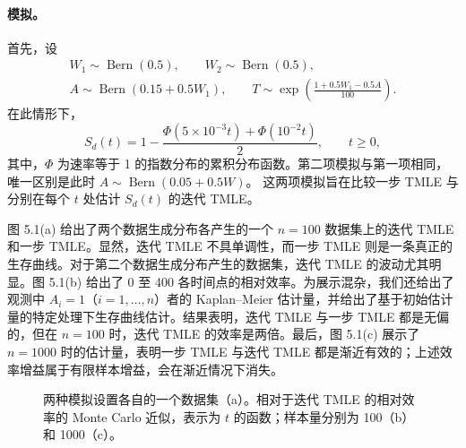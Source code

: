 \paragraph{模拟。}
首先，设
\[
 \begin{gathered}
 W_1\sim\operatorname{Bern}(0.5),\qquad
 W_2\sim\operatorname{Bern}(0.5),\\
 A\sim\operatorname{Bern}(0.15+0.5W_1),\qquad
 T\sim\exp\left(\frac{1+0.5W_1-0.5A}{100}\right).
 \end{gathered}
\]
在此情形下，
\[
 S_d(t)=1-\frac{\Phi(5\times10^{-3}t)+\Phi(10^{-2}t)}2,
 \qquad t\geq0,
\]
其中，$\Phi$ 为速率等于 1 的指数分布的累积分布函数。第二项模拟与第一项相同，唯一区别是此时
$A\sim\operatorname{Bern}(0.05+0.5W)$。
这两项模拟旨在比较一步 TMLE 与分别在每个 $t$ 处估计 $S_d(t)$ 的迭代 TMLE。

图 5.1(a) 给出了两个数据生成分布各产生的一个 $n=100$ 数据集上的迭代 TMLE 和一步 TMLE。显然，迭代 TMLE 不具单调性，而一步 TMLE 则是一条真正的生存曲线。对于第二个数据生成分布产生的数据集，迭代 TMLE 的波动尤其明显。图 5.1(b) 给出了 0 至 400 各时间点的相对效率。为展示混杂，我们还给出了观测中 $A_i=1$（$i=1,\ldots,n$）者的 Kaplan--Meier 估计量，并给出了基于初始估计量的特定处理下生存曲线估计。结果表明，迭代 TMLE 与一步 TMLE 都是无偏的，但在 $n=100$ 时，迭代 TMLE 的效率是两倍。最后，图 5.1(c) 展示了 $n=1000$ 时的估计量，表明一步 TMLE 与迭代 TMLE 都是渐近有效的；上述效率增益属于有限样本增益，会在渐近情况下消失。

\begin{figure}[p]
\centering

\caption{两种模拟设置各自的一个数据集（a）。相对于迭代 TMLE 的相对效率的 Monte Carlo 近似，表示为 $t$ 的函数；样本量分别为 100（b）和 1000（c）。}
\label{fig:ch05-survival-curves}
\end{figure}
\FloatBarrier
